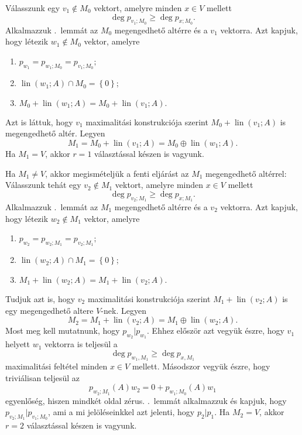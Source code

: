 \documentclass[9pt, a4paper, showtrims]{memoir}
\makeatletter
\let\Aref\relax
\renewenvironment{proof}[1][\proofname]
    {\par\pushQED{\qed}%
    \normalfont \topsep6\p@\@plus6\p@\relax
    \trivlist
    \item[\hskip\labelsep
        \itshape
    #1\@addpunct{:}]\ignorespaces}
    {\popQED\endtrivlist\@endpefalse}
\theoremstyle{plain}
\theoremstyle{remark}
\theoremstyle{definition}
\DeclareMathOperator{\lin}{lin}
\makeatother
\begin{document}
\begin{proof}
    Válasszunk egy $v_1\notin M_0$ vektort, amelyre minden $x\in V$ mellett
    \[
        \deg p_{v_1;M_0}\geq \deg p_{x;M_0}.
    \]
    Alkalmazzuk .~lemmát az $M_0$ megengedhető altérre és a $v_1$ vektorra.
    Azt kapjuk, hogy létezik $w_1\notin M_0$ vektor, amelyre
    \begin{enumerate}
        \item
            \(
            p_{w_1}
            =
            p_{w_1;M_0}
            =
            p_{v_1;M_0};
            \)
        \item 
            $\lin\left( w_1;A \right)\cap M_0=\left\{ 0 \right\}$;
        \item
            \(
            M_0+\lin\left( w_1;A \right)
            =
            M_0+\lin\left( v_1;A \right).
            \)
    \end{enumerate}
    Azt is láttuk, hogy $v_1$ maximalitási konstrukciója szerint $M_0+\lin\left( v_1;A \right)$ is megengedhető altér.
    Legyen $$M_1=M_0+\lin\left( v_1;A \right)=M_0\oplus\lin\left( w_1;A \right).$$
    Ha $M_1=V$, akkor $r=1$ választással készen is vagyunk.

    Ha $M_1\neq V$, akkor megismételjük a fenti eljárást az $M_1$ megengedhető altérrel:
    Válasszunk tehát egy $v_2\notin M_1$ vektort, amelyre minden $x\in V$ mellett
    \[
        \deg p_{v_2;M_1}\geq \deg p_{x;M_1}.
    \]
    Alkalmazzuk .~lemmát az $M_1$ megengedhető altérre és a $v_2$ vektorra.
    Azt kapjuk, hogy létezik $w_2\notin M_1$ vektor, amelyre
    \begin{enumerate}
        \item
            \(
            p_{w_2}
            =
            p_{w_2;M_1}
            =
            p_{v_2;M_1};
            \)
        \item 
            $\lin\left( w_2;A \right)\cap M_1=\left\{ 0 \right\}$;
        \item
            \(
            M_1+\lin\left( w_2;A \right)
            =
            M_1+\lin\left( v_2;A \right).
            \)
    \end{enumerate}
    Tudjuk azt is, hogy $v_2$ maximalitási konstrukciója szerint $M_1+\lin\left( v_2;A \right)$ is egy megengedhető altere $V$-nek.
    Legyen $$M_2=M_1+\lin\left( v_2;A \right)=M_1\oplus\lin\left( w_2;A \right).$$
    Most meg kell mutatnunk, hogy $p_{w_2}|p_{w_1}$. 
    Ehhez először azt vegyük észre, hogy $v_1$ helyett $w_1$ vektorra is teljesül a
    \[
        \deg p_{w_1,M_1}
        \geq
        \deg p_{x,M_1}
    \]
    maximalitási feltétel minden $x\in V$ mellett.
    Másodszor vegyük észre, hogy triviálisan teljesül az
    \[
        p_{w_2;M_1}\left( A \right)w_2=0+p_{w_1;M_0}\left( A \right)w_1
    \]
    egyenlőség, hiszen mindkét oldal zérus.
    \Aref{le:megengedhetolepes}.~lemmát alkalmazzuk és kapjuk, hogy
    $p_{v_2;M_1}|p_{v_1;M_0}$, ami a mi jelöléseinkkel azt jelenti, hogy $p_2|p_1$.
    Ha $M_2=V$, akkor $r=2$ választással készen is vagyunk.


\end{proof}
\end{document}
